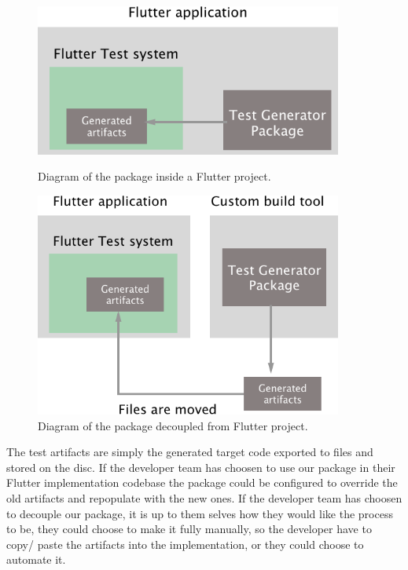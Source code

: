\begin{figure}[H]
    \centering
    \begin{minipage}{0.45\textwidth}
        \centering
        \includegraphics[width=0.9\textwidth]{images/Embedded-in-flutter.png}
        \caption{Diagram of the package inside a Flutter project.}
        \label{package_in_futter}
    \end{minipage}\hfill
    \begin{minipage}{0.45\textwidth}
        \centering
        \includegraphics[width=0.9\textwidth]{images/Decoupled-from-flutter.png}
        \caption{Diagram of the package decoupled from Flutter project.}
        \label{package_outside_flutter}
    \end{minipage}
\end{figure}

The test artifacts are simply the generated target code exported to files and stored on the disc. 
If the developer team has choosen to use our package in their Flutter implementation codebase the package could be configured to override the old artifacts and repopulate with the new ones.
If the developer team has choosen to decouple our package, it is up to them selves how they would like the process to be, they could choose to make it fully manually, so the developer have to copy/ paste the artifacts into the implementation, or they could choose to automate it.

